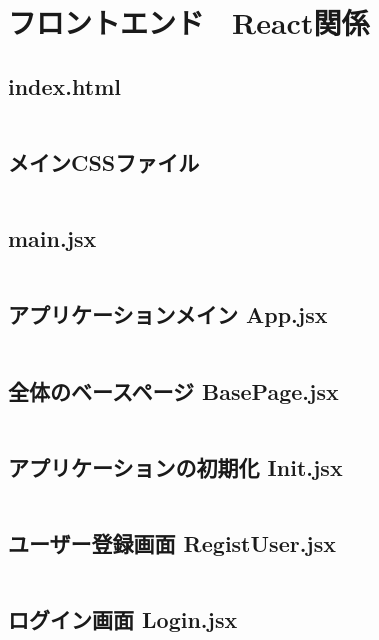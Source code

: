 \documentclass[paper=a4paper, fontsize=10pt, head_space=10mm, foot_space=17mm, gutter=17mm, line_length=185mm, twoside]{jlreq}
\begin{document}
\section {フロントエンド　React関係}
\subsection {index.html}
\inputminted[linenos, breaklines]{html}{index.html}
\clearpage

\subsection {メインCSSファイル}
\inputminted[linenos, breaklines]{css}{src-react/App.css}
\clearpage

\subsection {main.jsx}
\inputminted[linenos, breaklines]{jsx}{src-react/main.jsx}
\clearpage

\subsection {アプリケーションメイン App.jsx}
\inputminted[linenos, breaklines]{jsx}{src-react/App.jsx}
\clearpage

\subsection {全体のベースページ BasePage.jsx}
\inputminted[linenos, breaklines]{jsx}{src-react/BasePage.jsx}
\clearpage

\subsection {アプリケーションの初期化 Init.jsx}
\inputminted[linenos, breaklines]{jsx}{src-react/Init.jsx}
\clearpage

\subsection {ユーザー登録画面 RegistUser.jsx}
\inputminted[linenos, breaklines]{jsx}{src-react/RegistUser.jsx}
\clearpage

\subsection {ログイン画面 Login.jsx}
\inputminted[linenos, breaklines]{jsx}{src-react/Login.jsx}
\clearpage
\end{document}
